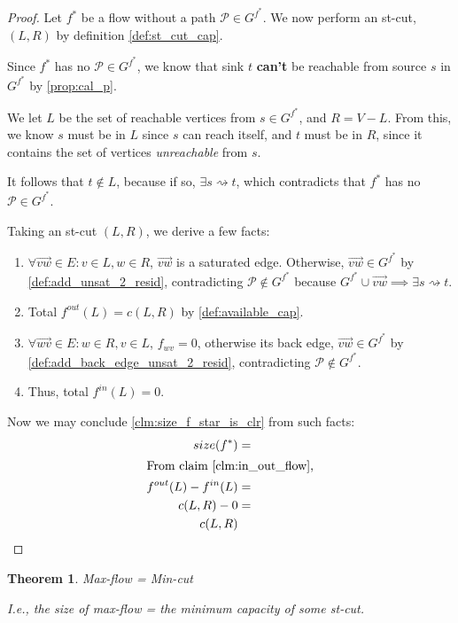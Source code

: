 \documentclass{article}
\newtheorem{theorem}{Theorem}[section]
\theoremstyle{definition}
\begin{document}
\begin{proof}
Let $f^*$ be a flow without a path $\mathcal{P} \in G^{f^*}$. We now perform an st-cut, $(L, R)$ by definition \ref{def:st_cut_cap}.

Since $f^*$ has no $\mathcal{P} \in G^{f^*}$, we know that sink $t$ \textbf{can't} be reachable from source $s$ in $G^{f^*}$ by \ref{prop:cal_p}. 

We let $L$ be the set of reachable vertices from $s \in G^{f^*}$, and $R = V - L$. From this, we know $s$ must be in $L$ since $s$ can reach itself, and $t$ must be in $R$, since it contains the set of vertices \textit{unreachable} from $s$. 

It follows that $t \notin L$, because if so, $\exists s \rightsquigarrow t$, which contradicts that $f^*$ has no $\mathcal{P} \in G^{f^*}$.

Taking an st-cut $(L,R)$, we derive a few facts:

\begin{enumerate}
	\item $\forall \overrightarrow{vw} \in E : v \in L, w \in R$, $\overrightarrow{vw}$ is a saturated edge. Otherwise, $\overrightarrow{vw} \in G^{f^*}$ by \ref{def:add_unsat_2_resid}, contradicting $\mathcal{P} \notin G^{f^*}$ because $G^{f^*} \cup \overrightarrow{vw} \implies \exists s \rightsquigarrow t$.
	\item Total $f^{out}(L) = c(L,R)$ by \ref{def:available_cap}.
	\item  $\forall \overrightarrow{wv} \in E : w \in R, v \in L$, $f_{wv} = 0$, otherwise its back edge, $\overrightarrow{vw} \in G^{f^*}$ by \ref{def:add_back_edge_unsat_2_resid}, contradicting $\mathcal{P} \notin G^{f^*}$.
	\item Thus, total $f^{in}(L) = 0$.
\end{enumerate}

Now we may conclude \ref{clm:size_f_star_is_clr} from such facts:
\begin{align*}
size(f^*) &=\\
\shortintertext{From claim \ref{clm:in_out_flow},}
f^{out}(L) - f^{in}(L)&=\\
c(L,R)- 0&=\\
c(L,R)
\end{align*}
\end{proof}

\begin{theorem}{Max-flow = Min-cut}
\label{thm:maxflowmincut}

I.e., the size of max-flow = the minimum capacity of some \textit{st-cut}.
\end{theorem}
\end{document}

